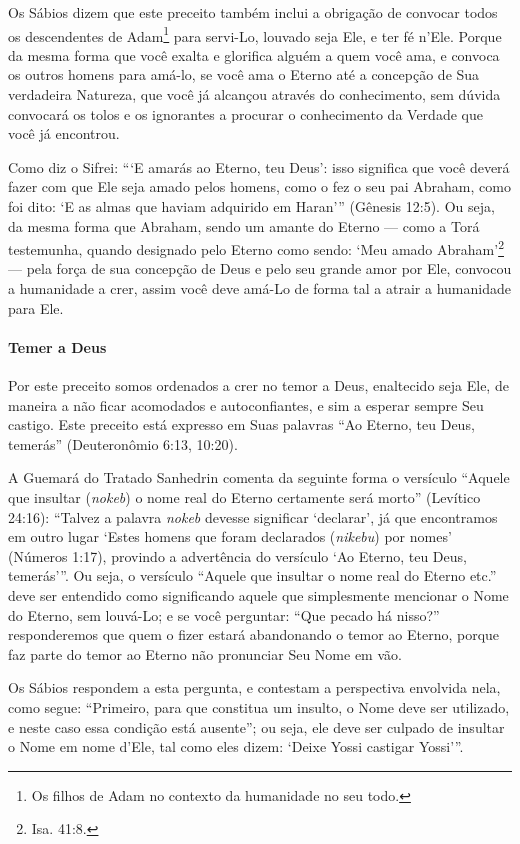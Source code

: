 Os Sábios dizem que este preceito também inclui a obrigação de convocar todos os descendentes de Adam\footnote{Os filhos de Adam no contexto da humanidade no seu todo.} para servi-Lo,
louvado seja Ele, e ter
fé n'Ele. Porque da mesma forma que você exalta e glorifica alguém a
quem você ama, e convoca os outros homens para amá-lo, se você ama o Eterno
até a concepção de Sua verdadeira Natureza, que você já alcançou através do
conhecimento, sem dúvida convocará os tolos e os ignorantes a procurar
o conhecimento da Verdade que você já encontrou.

Como diz o Sifrei: ```E amarás ao Eterno, teu Deus': isso significa que
você deverá fazer com que Ele seja amado pelos homens, como o fez o seu
pai Abraham, como foi dito: `E as almas que haviam adquirido em Haran'''
(Gênesis 12:5). Ou seja, da mesma forma que Abraham, sendo um amante do
Eterno --- como a Torá testemunha, quando designado pelo Eterno como
sendo: `Meu amado Abraham'\footnote{Isa. 41:8.} --- pela força de sua
concepção de Deus e pelo seu grande amor por Ele, convocou a humanidade a crer, assim você deve amá-Lo de forma tal a atrair a humanidade para Ele.

\paragraph{Temer a Deus}

Por este preceito somos ordenados a crer no temor a Deus, enaltecido
seja Ele, de maneira a não ficar acomodados e autoconfiantes, e sim a
esperar sempre Seu castigo. Este preceito está expresso em Suas
palavras ``Ao Eterno, teu Deus, temerás'' (Deuteronômio 6:13, 10:20).

A Guemará do Tratado Sanhedrin comenta da seguinte forma o versículo
``Aquele que insultar (\emph{nokeb}) o nome real do Eterno certamente
será morto'' (Levítico 24:16): ``Talvez a palavra \emph{nokeb} devesse
significar `declarar', já que encontramos em outro lugar `Estes homens
que foram declarados (\emph{nikebu}) por nomes' (Números 1:17), provindo
a advertência do versículo `Ao Eterno, teu Deus, temerás'''. Ou seja, o
versículo ``Aquele que insultar o nome real do Eterno etc.'' deve ser
entendido como significando aquele que simplesmente mencionar o Nome do
Eterno, sem louvá-Lo; e se você perguntar: ``Que pecado há nisso?'' responderemos que quem o fizer estará abandonando o temor
ao Eterno, porque faz parte do temor ao Eterno não pronunciar Seu Nome
em vão.

Os Sábios respondem a esta pergunta, e contestam a perspectiva envolvida
nela, como segue: ``Primeiro, para que constitua um insulto, o Nome deve
ser utilizado, e neste caso essa condição está ausente''; ou seja, ele
deve ser culpado de insultar o Nome em nome d'Ele, tal como eles dizem:
`Deixe Yossi castigar Yossi'''.


